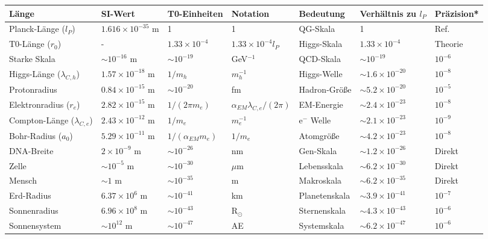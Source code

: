 \documentclass[12pt,a4paper]{article}
\begin{document}
\begin{table}[ht]
	\centering
	\begin{adjustbox}{scale=0.7}
		\begin{tabular}{lllllll}
			\hline
			\textbf{Länge} & \textbf{SI-Wert} & \textbf{T0-Einheiten} & \textbf{Notation} & \textbf{Bedeutung} & \textbf{Verhältnis zu $l_P$} & \textbf{Präzision*} \\
			\hline
			Planck-Länge ($l_P$) & $1.616 \times 10^{-35}$ m & 1 & 1 & QG-Skala & 1 & Ref. \\
			T0-Länge ($r_0$) & - & $1.33 \times 10^{-4}$ & $1.33 \times 10^{-4} l_P$ & Higgs-Skala & $1.33 \times 10^{-4}$ & Theorie \\
			Starke Skala & $\sim 10^{-16}$ m & $\sim 10^{-19}$ & GeV$^{-1}$ & QCD-Skala & $\sim 10^{-19}$ & $10^{-6}$ \\
			Higgs-Länge ($\lambda_{C,h}$) & $1.57 \times 10^{-18}$ m & $1/m_h$ & $m_h^{-1}$ & Higgs-Welle & $\sim 1.6 \times 10^{-20}$ & $10^{-8}$ \\
			Protonradius & $0.84 \times 10^{-15}$ m & $\sim 10^{-20}$ & fm & Hadron-Größe & $\sim 5.2 \times 10^{-20}$ & $10^{-5}$ \\
			Elektronradius ($r_e$) & $2.82 \times 10^{-15}$ m & $1/(2\pi m_e)$ & $\alpha_{EM} \lambda_{C,e}/(2\pi)$ & EM-Energie & $\sim 2.4 \times 10^{-23}$ & $10^{-8}$ \\
			Compton-Länge ($\lambda_{C,e}$) & $2.43 \times 10^{-12}$ m & $1/m_e$ & $m_e^{-1}$ & e$^-$ Welle & $\sim 2.1 \times 10^{-23}$ & $10^{-9}$ \\
			Bohr-Radius ($a_0$) & $5.29 \times 10^{-11}$ m & $1/(\alpha_{EM} m_e)$ & $1/m_e$ & Atomgröße & $\sim 4.2 \times 10^{-23}$ & $10^{-8}$ \\
			DNA-Breite & $2 \times 10^{-9}$ m & $\sim 10^{-26}$ & nm & Gen-Skala & $\sim 1.2 \times 10^{-26}$ & Direkt \\
			Zelle & $\sim 10^{-5}$ m & $\sim 10^{-30}$ & $\mu$m & Lebensskala & $\sim 6.2 \times 10^{-30}$ & Direkt \\
			Mensch & $\sim 1$ m & $\sim 10^{-35}$ & m & Makroskala & $\sim 6.2 \times 10^{-35}$ & Direkt \\
			Erd-Radius & $6.37 \times 10^{6}$ m & $\sim 10^{-41}$ & km & Planetenskala & $\sim 3.9 \times 10^{-41}$ & $10^{-7}$ \\
			Sonnenradius & $6.96 \times 10^{8}$ m & $\sim 10^{-43}$ & R$_{\odot}$ & Sternenskala & $\sim 4.3 \times 10^{-43}$ & $10^{-6}$ \\
			Sonnensystem & $\sim 10^{12}$ m & $\sim 10^{-47}$ & AE & Systemskala & $\sim 6.2 \times 10^{-47}$ & $10^{-6}$ \\

\end{tabular}
\end{adjustbox}
\end{table}
\end{document}
